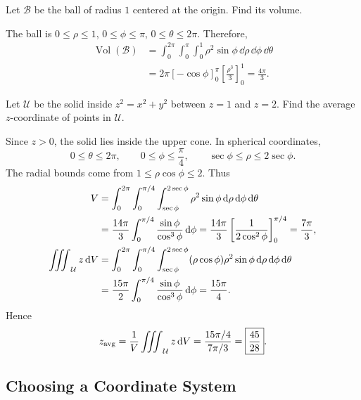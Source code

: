 \clearpage
\begin{example}
Let $\mathcal{B}$ be the ball of radius $1$ centered at the origin. Find its volume.
\end{example}

\begin{sol}
The ball is $0 \leq \rho \leq 1$, $0 \leq \phi \leq \pi$, $0 \leq \theta \leq 2\pi$. Therefore,
\begin{align*}
    \operatorname{Vol}(\mathcal{B})
    &= \int_0^{2\pi}\int_0^\pi\int_0^1
    \rho^2\sin\phi\,\dd{\rho}\,\dd{\phi}\,\dd{\theta}\\
    &= 2\pi\left[-\cos\phi\right]_0^\pi
    \left[\frac{\rho^3}{3}\right]_0^1
    = \boxed{\frac{4\pi}{3}}.
\end{align*}
\end{sol}

\begin{example}
Let $\mathcal{U}$ be the solid inside $z^2 = x^2 + y^2$ between $z = 1$ and $z = 2$. Find the average $z$-coordinate of points in $\mathcal{U}$.
\end{example}

\begin{sol}
Since $z > 0$, the solid lies inside the upper cone. In spherical coordinates,
\[
    0 \leq \theta \leq 2\pi,\qquad
    0 \leq \phi \leq \frac{\pi}{4},\qquad
    \sec\phi \leq \rho \leq 2\sec\phi.
\]
The radial bounds come from $1 \leq \rho\cos\phi \leq 2$. Thus
\begin{align*}
    V &= \int_0^{2\pi}\int_0^{\pi/4}\int_{\sec\phi}^{2\sec\phi}
    \rho^2\sin\phi\,\mathrm{d}\rho\,\mathrm{d}\phi\,\mathrm{d}\theta\\
    &= \frac{14\pi}{3}\int_0^{\pi/4}\frac{\sin\phi}{\cos^3\phi}\,\mathrm{d}\phi
    = \frac{14\pi}{3}\left[\frac{1}{2\cos^2\phi}\right]_0^{\pi/4}
    = \frac{7\pi}{3},\\
    \mathop{\int\mkern-10mu\int\mkern-10mu\int}\nolimits_{\mathcal{U}} z \, \mathrm{d}V
    &= \int_0^{2\pi}\int_0^{\pi/4}\int_{\sec\phi}^{2\sec\phi}
    (\rho\cos\phi)\rho^2\sin\phi\,\mathrm{d}\rho\,\mathrm{d}\phi\,\mathrm{d}\theta\\
    &= \frac{15\pi}{2}\int_0^{\pi/4}\frac{\sin\phi}{\cos^3\phi}\,\mathrm{d}\phi
    = \frac{15\pi}{4}.
\end{align*}
Hence
\[
    z_{\mathrm{avg}} = \frac{1}{V}\mathop{\int\mkern-10mu\int\mkern-10mu\int}\nolimits_{\mathcal{U}} z \, \mathrm{d}V
    = \frac{15\pi/4}{7\pi/3} = \boxed{\frac{45}{28}}.
\]
\end{sol}

\clearpage
\subsection{Choosing a Coordinate System}

